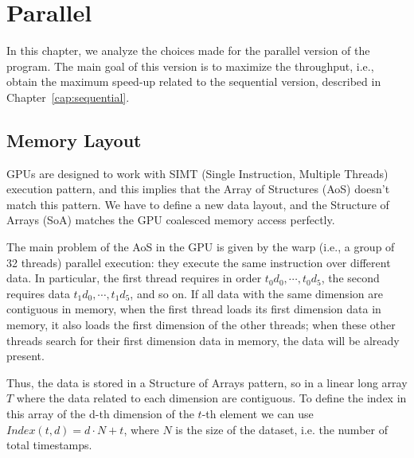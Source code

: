 \chapter{Parallel}
\label{cap:parallel}
In this chapter, we analyze the choices made for the parallel version of the program. The main goal of this version is to maximize the throughput, i.e., obtain the maximum speed-up related to the sequential version, described in Chapter~\ref{cap:sequential}.

\section{Memory Layout}
\label{sec:par_memory_layout}
GPUs are designed to work with SIMT (Single Instruction, Multiple Threads) execution pattern, and this implies that the Array of Structures (AoS) doesn't match this pattern. We have to define a new data layout, and the Structure of Arrays (SoA) matches the GPU coalesced memory access perfectly.

\myskip

The main problem of the AoS in the GPU is given by the warp (i.e., a group of 32 threads) parallel execution: they execute the same instruction over different data. In particular, the first thread requires in order $t_0d_0,\cdots,t_0d_5$, the second requires data $t_1d_0,\cdots,t_1d_5$, and so on. If all data with the same dimension are contiguous in memory, when the first thread loads its first dimension data in memory, it also loads the first dimension of the other threads; when these other threads search for their first dimension data in memory, the data will be already present.

Thus, the data is stored in a Structure of Arrays pattern, so in a linear long array $T$ where the data related to each dimension are contiguous. To define the index in this array of the d-th dimension of the $t$-th element we can use $Index(t,d)=d\cdot N+t$, where $N$ is the size of the dataset, i.e. the number of total timestamps.

